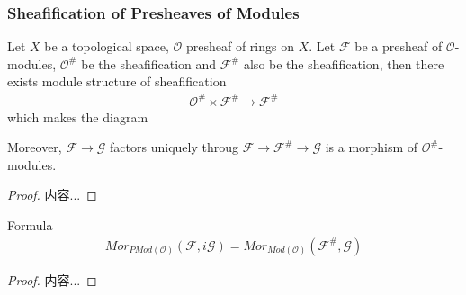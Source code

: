 \documentclass[Total.tex]{subfiles}
\begin{document}
				\subsubsection{Sheafification of Presheaves of Modules}
					\begin{lemma}
						Let $X$ be a topological space, $\mathcal{O}$ presheaf of rings on $X$. Let $\mathcal{F}$ be a presheaf of $\mathcal{O}$-modules, $\mathcal{O}^\#$ be the sheafification and $\mathcal{F}^\#$ also be the sheafification, then there exists module structure of sheafification
						\begin{gather*}
							\mathcal{O}^\#\times \mathcal{F}^\#\rightarrow \mathcal{F}^\#
						\end{gather*}
						which makes the diagram
						\begin{center}
						\end{center}
						Moreover, $\mathcal{F}\rightarrow \mathcal{G}$ factors uniquely throug $\mathcal{F}\rightarrow \mathcal{F}^\#\rightarrow \mathcal{G}$ is a morphism of $\mathcal{O}^\#$-modules.
					\end{lemma}
					\begin{proof}
						内容...
					\end{proof}
					\begin{corollary}
						Formula
						\begin{gather*}
							Mor_{PMod(\mathcal{O})}(\mathcal{F},i\mathcal{G})=Mor_{Mod(\mathcal{O})}(\mathcal{F}^\#,\mathcal{G})
						\end{gather*}
					\end{corollary}
					\begin{proof}
						内容...
					\end{proof}
					
\end{document}
